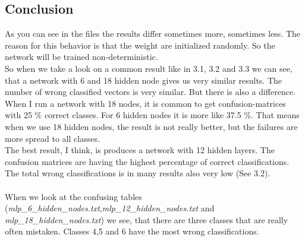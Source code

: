\documentclass[10pt,a4paper]{article}
\begin{document}
	\subsection{Conclusion}						%
	As you can see in the files the results differ sometimes more, sometimes less. The reason for this behavior is that the weight are initialized randomly. So the network will be trained non-deterministic. \\
	So when we take a look on a common result like in 3.1, 3.2 and 3.3 we can see, that a network with 6 and 18 hidden node gives us very similar results. The number of wrong classified vectors is very similar. But there is also a difference. When I run a network with 18 nodes, it is common to get confusion-matrices with 25 \% correct classes. For 6 hidden nodes it is more like 37.5 \%. That means when we use 18 hidden nodes, the result is not really better, but the failures are more spread to all classes. \\
	The best result, I think, is produces a network with 12 hidden layers. The confusion matrices are having the highest percentage of correct classifications. The total wrong classifications is in many results also very low (See 3.2).
	\\
	\\
	When we look at the confusing tables (\textit{mlp\_6\_hidden\_nodes.txt},\textit{mlp\_12\_hidden\_nodes.txt} and \textit{mlp\_18\_hidden\_nodes.txt}) we see, that there are three classes that are really often mistaken. Classes 4,5 and 6 have the most wrong classifications.
	
\end{document}
